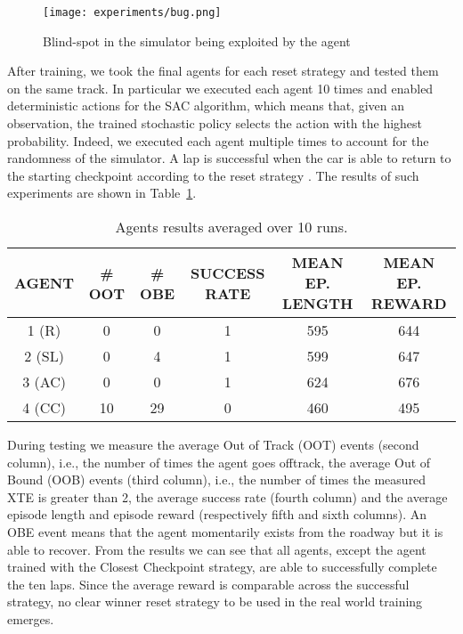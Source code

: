 \begin{figure}[h]
  \begin{center}
    \texttt{[image: experiments/bug.png]}
  \end{center}
  \caption{Blind-spot in the simulator being exploited by the agent}
  \label{fig:bug}
\end{figure}

After training, we took the final agents for each reset strategy and tested them on the same track. In particular we executed each agent 10 times and enabled deterministic actions for the SAC algorithm, which means that, given an observation, the trained stochastic policy selects the action with the highest probability. Indeed, we executed each agent multiple times to account for the randomness of the simulator. A lap is successful when the car is able to return to the starting checkpoint according to the reset strategy . The results of such experiments are shown in Table~\ref{tab:simagent}.


\begin{table}
  \centering
  \begin{tabular}{|c|c|c|c|c|c|}
  \hline
  AGENT & \# OOT & \# OBE & SUCCESS RATE & MEAN EP. LENGTH & MEAN EP. REWARD \\ \hline
  1 (R) & 0 & 0 & 1 & 595 & 644 \\
  2 (SL) & 0 & 4 & 1 & 599 & 647  \\ \hline
  3 (AC) & 0 & 0 & 1 & 624 & 676 \\
  4 (CC) & 10 & 29 & 0 & 460 & 495  \\ \hline
  \end{tabular}
  \caption{Agents results averaged over 10 runs. }
  \label{tab:simagent}
\end{table}

During testing we measure the average Out of Track (OOT) events (second column), i.e., the number of times the agent goes offtrack, the average Out of Bound (OOB) events (third column), i.e., the number of times the measured XTE is greater than 2, the average success rate (fourth column) and the average episode length and episode reward (respectively fifth and sixth columns). An OBE event means that the agent momentarily exists from the roadway but it is able to recover. From the results we can see that all agents, except the agent trained with the Closest Checkpoint strategy, are able to successfully complete the ten laps. Since the average reward is comparable across the successful strategy, no clear winner reset strategy to be used in the real world training emerges.

